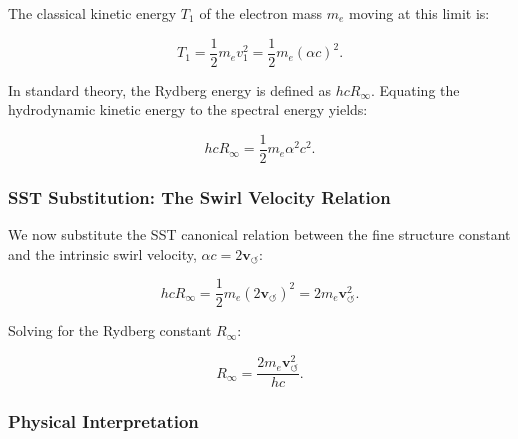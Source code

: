 \documentclass[10pt,reprint,aps,onecolumn,nofootinbib]{revtex4-2}
\begin{document}
            The classical kinetic energy $T_1$ of the electron mass $m_e$ moving
            at this limit is:

            \begin{equation}
                T_1 = \frac{1}{2} m_e v_1^2 = \frac{1}{2} m_e (\alpha c)^2.
            \end{equation}

            In standard theory, the Rydberg energy is defined as $hcR_\infty$.
            Equating the hydrodynamic kinetic energy to the spectral energy yields:

            \begin{equation}
                hcR_\infty = \frac{1}{2} m_e \alpha^2 c^2.
            \end{equation}

        \subsubsection*{SST Substitution: The Swirl Velocity Relation}

            We now substitute the SST canonical relation between the fine structure
            constant and the intrinsic swirl velocity, $\alpha c = 2 \mathbf{v}_{\!\boldsymbol{\circlearrowleft}}$:

            \begin{equation}
                hcR_\infty = \frac{1}{2} m_e (2 \mathbf{v}_{\!\boldsymbol{\circlearrowleft}})^2
                = 2 m_e \mathbf{v}_{\!\boldsymbol{\circlearrowleft}}^2.
            \end{equation}

            Solving for the Rydberg constant $R_\infty$:

            \begin{equation}
                R_\infty = \frac{2 m_e \mathbf{v}_{\!\boldsymbol{\circlearrowleft}}^2}{hc}.
                \label{eq:SST_Rydberg}
            \end{equation}

        \subsubsection*{Physical Interpretation}
\end{document}
